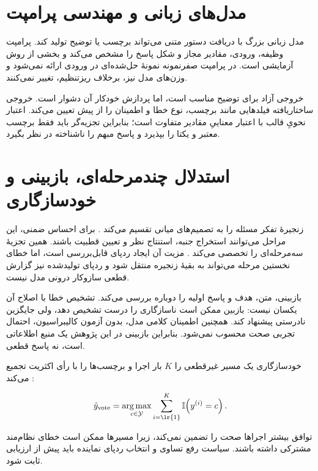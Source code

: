 \section{مدل‌های زبانی و مهندسی پرامپت}

مدل زبانی بزرگ با دریافت دستور متنی می‌تواند برچسب یا توضیح تولید کند. پرامپت وظیفه، ورودی، مقادیر مجاز و شکل پاسخ را مشخص می‌کند و بخشی از روش آزمایشی است. در پرامپت صفرنمونه نمونۀ حل‌شده‌ای در ورودی ارائه نمی‌شود و وزن‌های مدل نیز، برخلاف ریزتنظیم، تغییر نمی‌کنند.

خروجی آزاد برای توضیح مناسب است، اما پردازش خودکار آن دشوار است. خروجی ساختاریافته فیلدهایی مانند برچسب، نوع خطا و اطمینان را از پیش تعیین می‌کند. اعتبار نحویِ قالب با اعتبار معناییِ مقادیر متفاوت است؛ بنابراین تجزیه‌گر باید فقط برچسب معتبر و یکتا را بپذیرد و پاسخ مبهم را ناشناخته در نظر بگیرد.

\section{استدلال چندمرحله‌ای، بازبینی و خودسازگاری}

زنجیرۀ تفکر مسئله را به تصمیم‌های میانی تقسیم می‌کند \cite{wei2022cot}. برای احساس ضمنی، این مراحل می‌توانند استخراج جنبه، استنتاج نظر و تعیین قطبیت باشند.  همین تجزیۀ سه‌مرحله‌ای را تخصصی می‌کند \cite{fei2023thor}. مزیت آن ایجاد ردپای قابل‌بررسی است، اما خطای نخستین مرحله می‌تواند به بقیۀ زنجیره منتقل شود و ردپای تولیدشده نیز گزارش قطعی سازوکار درونی مدل نیست.

بازبینی، متن، هدف و پاسخ اولیه را دوباره بررسی می‌کند. تشخیص خطا با اصلاح آن یکسان نیست: بازبین ممکن است ناسازگاری را درست تشخیص دهد، ولی جایگزین نادرستی پیشنهاد کند. همچنین اطمینان کلامی مدل، بدون آزمون کالیبراسیون، احتمال تجربی صحت محسوب نمی‌شود. بنابراین بازبینی در این پژوهش یک منبع اطلاعاتی است، نه پاسخ قطعی.

خودسازگاری یک مسیر غیرقطعی را $K$ بار اجرا و برچسب‌ها را با رأی اکثریت تجمیع می‌کند \cite{wang2023selfconsistency}:

\begin{equation}
    \hat{y}_{\mathrm{vote}}
    = \underset{c \in \mathcal{Y}}{\operatorname{arg\,max}}
    \sum_{i=\text{\lr{1}}}^{K} \mathbb{I}\!\left(y^{(i)}=c\right).
    \label{eq:majority-vote}
\end{equation}

توافق بیشتر اجراها صحت را تضمین نمی‌کند، زیرا مسیرها ممکن است خطای نظام‌مند مشترکی داشته باشند. سیاست رفع تساوی و انتخاب ردپای نماینده باید پیش از ارزیابی ثابت شود.

